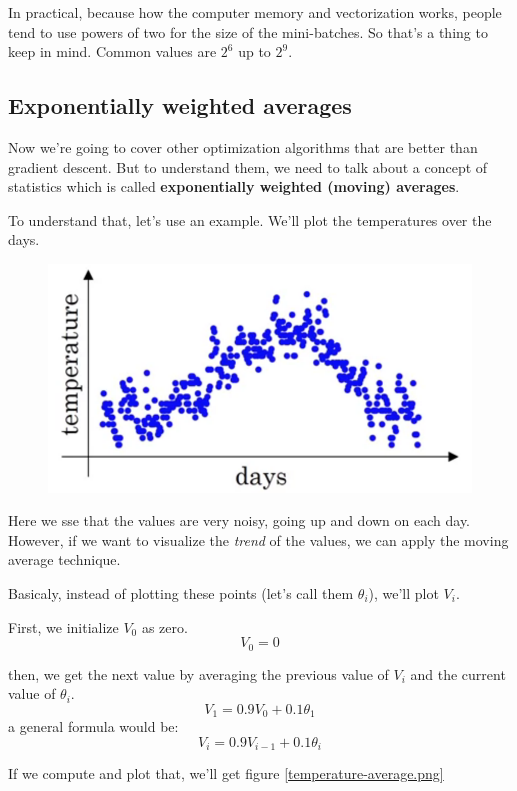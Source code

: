 \documentclass[12pt, a4paper, oneside]{book}
\begin{document}
In practical, because how the computer memory and vectorization works, people
tend to use powers of two for the size of the mini-batches. So that's a thing to
keep in mind. Common values are $2^{6}$ up to $2^{9}$.

\subsection{Exponentially weighted averages}%
\label{sub:exponentially_weighted_averages}

Now we're going to cover other optimization algorithms that are better than
gradient descent. But to understand them, we need to talk about a concept of
statistics which is called \textbf{exponentially weighted (moving) averages}.

To understand that, let's use an example. We'll plot the temperatures over the
days.

\begin{figure}[h]
\centering
\includegraphics[scale=0.4]{Res/temperatures-london.png}
\label{temperatures-london.png}
\end{figure}

Here we sse that the values are very noisy, going up and down on each day.
However, if we want to visualize the \textit{trend} of the values, we can apply
the moving average technique.

Basicaly, instead of plotting these points (let's call them $\theta_i$), we'll
plot $V_i$.

First, we initialize $V_0$ as zero.
\[
V_0=0
\]

then, we get the next value by averaging the previous value of $V_i$ and the
current value of $\theta_i$.
\[
V_1=0.9V_0+0.1\theta_1
\]
a general formula would be:
\[ \boxed{
    V_i = 0.9V_{i-1}+0.1\theta_i
}\]

If we compute and plot that, we'll get figure \ref{temperature-average.png}
\end{document}
